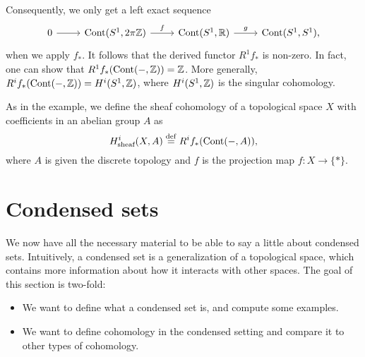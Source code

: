 \documentclass{article}
\DeclareMathOperator{\Cont}{Cont}
\begin{document}
\begin{example}
    Consequently, we only get a left exact sequence
    \begin{equation*}
        \begin{tikzcd}
            0 \rar & \Cont(S^1, 2\pi \bbZ) \rar["f"] & \Cont(S^1, \bbR)
            \rar["g"] & \Cont(S^1, S^1),
        \end{tikzcd}
    \end{equation*}
    when we apply $f_*$. It follows that the derived functor $R^1f_*$ is
    non-zero. In fact, one can show that $R^1f_*(\Cont(-, \bbZ)) = \bbZ$.
    More generally, $R^if_*(\Cont(-, \bbZ)) = H^i(S^1 , \bbZ)$, where
    $H^i(S^1, \mathbb{Z})$ is the singular cohomology.
\end{example}

As in the example, we define the sheaf
cohomology of a topological space $X$ with coefficients in an
abelian group $A$ as
\begin{equation*}
    H^i_{\text{sheaf}}(X, A) \defeq R^if_*(\Cont(-, A)),
\end{equation*}
where $A$ is given the discrete topology and $f$ is the
projection map $f\colon X \to \{*\}$.
\section{Condensed sets}

We now have all the necessary material to be able to say a little
about condensed sets. Intuitively, a condensed set
is a generalization of a topological space, which contains
more information about how it interacts with other spaces.
The goal of this section is two-fold:
\begin{itemize}
    \item We want to define what a condensed set is,
          and compute some examples.
    \item We want to define cohomology in the condensed
          setting and compare it to other types of cohomology.
\end{itemize}
\end{document}
